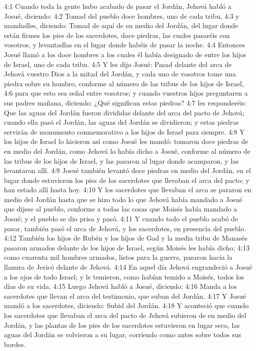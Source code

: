 4:1 Cuando toda la gente hubo acabado de pasar el Jordán, Jehová habló a Josué, diciendo:  
4:2 Tomad del pueblo doce hombres, uno de cada tribu,  
4:3 y mandadles, diciendo: Tomad de aquí de en medio del Jordán, del lugar donde están firmes los pies de los sacerdotes, doce piedras, las cuales pasaréis con vosotros, y levantadlas en el lugar donde habéis de pasar la noche.  
4:4 Entonces Josué llamó a los doce hombres a los cuales él había designado de entre los hijos de Israel, uno de cada tribu.  
4:5 Y les dijo Josué: Pasad delante del arca de Jehová vuestro Dios a la mitad del Jordán, y cada uno de vosotros tome una piedra sobre su hombro, conforme al número de las tribus de los hijos de Israel,  
4:6 para que esto sea señal entre vosotros; y cuando vuestros hijos preguntaren a sus padres mañana, diciendo: ¿Qué significan estas piedras?  
4:7 les responderéis: Que las aguas del Jordán fueron divididas delante del arca del pacto de Jehová; cuando ella pasó el Jordán, las aguas del Jordán se dividieron; y estas piedras servirán de monumento conmemorativo a los hijos de Israel para siempre.  
4:8 Y los hijos de Israel lo hicieron así como Josué les mandó: tomaron doce piedras de en medio del Jordán, como Jehová lo había dicho a Josué, conforme al número de las tribus de los hijos de Israel, y las pasaron al lugar donde acamparon, y las levantaron allí.  
4:9 Josué también levantó doce piedras en medio del Jordán, en el lugar donde estuvieron los pies de los sacerdotes que llevaban el arca del pacto; y han estado allí hasta hoy.  
4:10 Y los sacerdotes que llevaban el arca se pararon en medio del Jordán hasta que se hizo todo lo que Jehová había mandado a Josué que dijese al pueblo, conforme a todas las cosas que Moisés había mandado a Josué; y el pueblo se dio prisa y pasó.  
4:11 Y cuando todo el pueblo acabó de pasar, también pasó el arca de Jehová, y los sacerdotes, en presencia del pueblo.  
4:12 También los hijos de Rubén y los hijos de Gad y la media tribu de Manasés pasaron armados delante de los hijos de Israel, según Moisés les había dicho;  
4:13 como cuarenta mil hombres armados, listos para la guerra, pasaron hacia la llanura de Jericó delante de Jehová.  
4:14 En aquel día Jehová engrandeció a Josué a los ojos de todo Israel; y le temieron, como habían temido a Moisés, todos los días de su vida.  
4:15 Luego Jehová habló a Josué, diciendo:  
4:16 Manda a los sacerdotes que llevan el arca del testimonio, que suban del Jordán.  
4:17 Y Josué mandó a los sacerdotes, diciendo: Subid del Jordán.  
4:18 Y aconteció que cuando los sacerdotes que llevaban el arca del pacto de Jehová subieron de en medio del Jordán, y las plantas de los pies de los sacerdotes estuvieron en lugar seco, las aguas del Jordán se volvieron a su lugar, corriendo como antes sobre todos sus bordes.  
